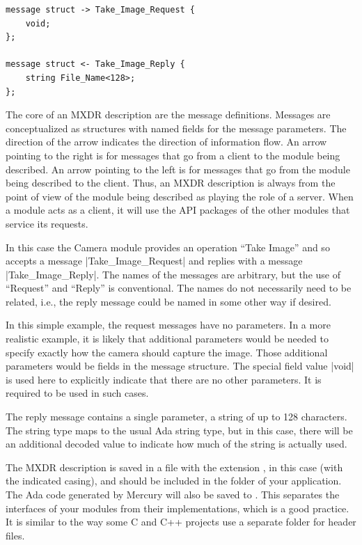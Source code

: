 \begin{verbatim}
message struct -> Take_Image_Request {
    void;
};

message struct <- Take_Image_Reply {
    string File_Name<128>;
};
\end{verbatim}

The core of an MXDR description are the message definitions. Messages are conceptualized as
structures with named fields for the message parameters. The direction of the arrow indicates
the direction of information flow. An arrow pointing to the right is for messages that go from a
client to the module being described. An arrow pointing to the left is for messages that go from
the module being described to the client. Thus, an MXDR description is always from the point of
view of the module being described as playing the role of a server. When a module acts as a
client, it will use the API packages of the other modules that service its requests.

In this case the Camera module provides an operation ``Take Image'' and so accepts a message
|Take_Image_Request| and replies with a message |Take_Image_Reply|. The names of the messages
are arbitrary, but the use of ``Request'' and ``Reply'' is conventional. The names do not
necessarily need to be related, i.e., the reply message could be named in some other way if
desired.

In this simple example, the request messages have no parameters. In a more realistic example, it
is likely that additional parameters would be needed to specify exactly how the camera should
capture the image. Those additional parameters would be fields in the message structure. The
special field value |void| is used here to explicitly indicate that there are no other
parameters. It is required to be used in such cases.

The reply message contains a single parameter, a string of up to 128 characters. The string type
maps to the usual Ada string type, but in this case, there will be an additional decoded
value to indicate how much of the string is actually used.

The MXDR description is saved in a file with the extension , in this case
 (with the indicated casing), and should be included in the
 folder of your application. The Ada code generated by Mercury will also be
saved to . This separates the interfaces of your modules from their
implementations, which is a good practice. It is similar to the way some C and C++ projects use
a separate folder for header files.

